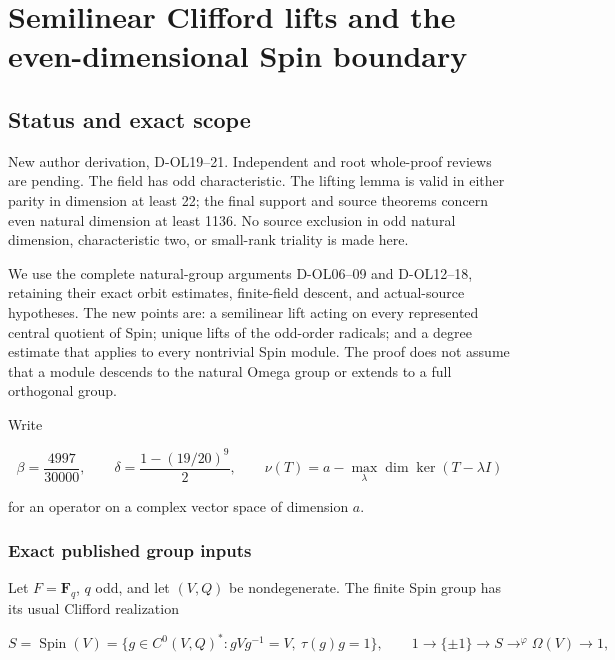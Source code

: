 \section{Semilinear Clifford lifts and the even-dimensional Spin boundary}\label{semilinear-clifford-lifts-and-the-even-dimensional-spin-boundary}

\subsection{Status and exact scope}\label{status-and-exact-scope}

New author derivation, D-OL19--21. Independent and root whole-proof reviews are pending. The field has odd characteristic. The lifting lemma is valid in either parity in dimension at least 22; the final support and source theorems concern even natural dimension at least 1136. No source exclusion in odd natural dimension, characteristic two, or small-rank triality is made here.

We use the complete natural-group arguments D-OL06--09 and D-OL12--18, retaining their exact orbit estimates, finite-field descent, and actual-source hypotheses. The new points are: a semilinear lift acting on every represented central quotient of Spin; unique lifts of the odd-order radicals; and a degree estimate that applies to every nontrivial Spin module. The proof does not assume that a module descends to the natural Omega group or extends to a full orthogonal group.

Write

\[
 \beta=\frac{4997}{30000},\qquad
 \delta=\frac{1-(19/20)^9}{2},\qquad
 \nu(T)=a-\max_\lambda\dim\ker(T-\lambda I)
 \tag{SP.1}
\]

for an operator on a complex vector space of dimension \(a\).

\subsubsection{Exact published group inputs}\label{exact-published-group-inputs}

Let \(F=\mathbf F_q\), \(q\) odd, and let \((V,Q)\) be nondegenerate. The finite Spin group has its usual Clifford realization

\[
 S=\operatorname{Spin}(V)
 =\{g\in C^0(V,Q)^*:gVg^{-1}=V,\ \tau(g)g=1\},
 \qquad
 1\longrightarrow\{\pm1\}\longrightarrow S
 \mathop{\longrightarrow}^{\varphi}\Omega(V)\longrightarrow1,
 \tag{SP.2}
\]

